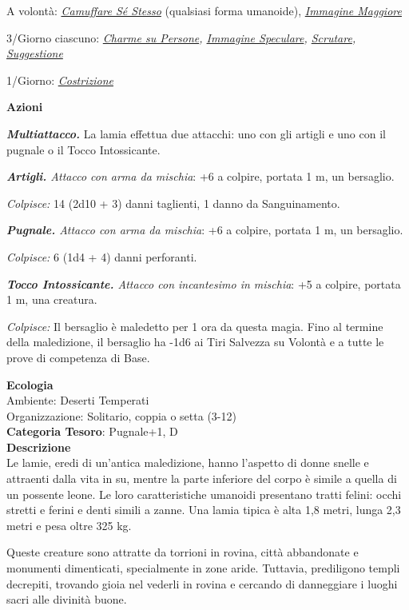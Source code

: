 \begin{multicols}{2}
{A volontà: \emph{\hyperlink{Camuffare Sé Stesso}{Camuffare Sé Stesso}} (qualsiasi forma umanoide), \emph{\hyperlink{Immagine Maggiore}{Immagine Maggiore}}

3/Giorno ciascuno: \emph{\hyperlink{Charme su Persone}{Charme su Persone}, \hyperlink{Immagine Speculare}{Immagine Speculare}, \hyperlink{Scrutare}{Scrutare}, \hyperlink{Suggestione}{Suggestione}}

1/Giorno: \emph{\hyperlink{Costrizione}{Costrizione}}

\textbf{Azioni}

\emph{\textbf{Multiattacco.}} La lamia effettua due attacchi: uno con gli artigli e uno con il pugnale o il Tocco Intossicante.

\emph{\textbf{Artigli.} Attacco con arma da mischia}: +6 a colpire, portata 1 m, un bersaglio.

\emph{Colpisce:} 14 (2d10 + 3) danni taglienti, 1 danno da Sanguinamento.

\emph{\textbf{Pugnale.} Attacco con arma da mischia}: +6 a colpire, portata 1 m, un bersaglio.

\emph{Colpisce:} 6 (1d4 + 4) danni perforanti.

\emph{\textbf{Tocco Intossicante.} Attacco con incantesimo in mischia}: +5 a colpire, portata 1 m, una creatura.

\emph{Colpisce:} Il bersaglio è maledetto per 1 ora da questa magia. Fino al termine della maledizione, il bersaglio ha -1d6 ai Tiri Salvezza su Volontà e a tutte le prove di competenza di Base.

\textbf{Ecologia}\\
Ambiente: Deserti Temperati\\
Organizzazione: Solitario, coppia o setta (3-12)\\
\textbf{Categoria Tesoro}: Pugnale+1, D\\

\textbf{Descrizione}\\
Le lamie, eredi di un'antica maledizione, hanno l'aspetto di donne snelle e attraenti dalla vita in su, mentre la parte inferiore del corpo è simile a quella di un possente leone. Le loro caratteristiche umanoidi presentano tratti felini: occhi stretti e ferini e denti simili a zanne. Una lamia tipica è alta 1,8 metri, lunga 2,3 metri e pesa oltre 325 kg.

Queste creature sono attratte da torrioni in rovina, città abbandonate e monumenti dimenticati, specialmente in zone aride. Tuttavia, prediligono templi decrepiti, trovando gioia nel vederli in rovina e cercando di danneggiare i luoghi sacri alle divinità buone.

}
\end{multicols}
